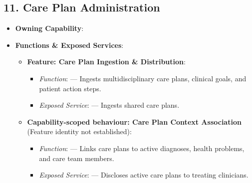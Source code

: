 \par\smallskip
{}\label{rad:sa:182}
\subsection*{11. Care Plan Administration}
\label{rad:sa:183}

\begin{itemize}

\item 
\textbf{Owning Capability}: \texttt{}



\item 
\textbf{Functions \& Exposed Services}:


\begin{itemize}

\item 
\textbf{Feature: Care Plan Ingestion \& Distribution}:


\begin{itemize}

\item 
\emph{Function}: \texttt{} — Ingests multidisciplinary care plans, clinical goals, and patient action steps.



\item 
\emph{Exposed Service}: \texttt{} — Ingests shared care plans.



\end{itemize}


\item 
\textbf{Capability-scoped behaviour: Care Plan Context Association} (Feature identity not established):


\begin{itemize}

\item 
\emph{Function}: \texttt{} — Links care plans to active diagnoses, health problems, and care team members.



\item 
\emph{Exposed Service}: \texttt{} — Discloses active care plans to treating clinicians.



\end{itemize}



\end{itemize}
\end{itemize}
